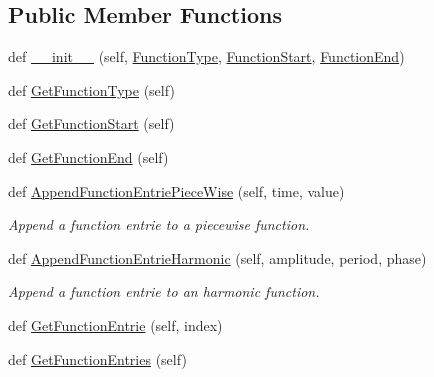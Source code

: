 \subsection*{Public Member Functions}
\begin{DoxyCompactItemize}
\item 
def \hyperlink{classgebtaero_1_1_time_function_1_1_time_function_a5f3a6ae6418be0f44d7a549af4a3f339}{\+\_\+\+\_\+init\+\_\+\+\_\+} (self, \hyperlink{classgebtaero_1_1_time_function_1_1_time_function_a71eb6968c49304736305aee5c1e37d51}{Function\+Type}, \hyperlink{classgebtaero_1_1_time_function_1_1_time_function_acd9020ddfc729ecc704fa0c246c2e903}{Function\+Start}, \hyperlink{classgebtaero_1_1_time_function_1_1_time_function_a21c1d719341196b82dd2def3400dd832}{Function\+End})
\item 
def \hyperlink{classgebtaero_1_1_time_function_1_1_time_function_a8dc2ddec757f586a51e250592b35c542}{Get\+Function\+Type} (self)
\item 
def \hyperlink{classgebtaero_1_1_time_function_1_1_time_function_a0ac4b6ccaaa06bb59697d195c213a23e}{Get\+Function\+Start} (self)
\item 
def \hyperlink{classgebtaero_1_1_time_function_1_1_time_function_afd4cbf5dab2375296785f178369bd16c}{Get\+Function\+End} (self)
\item 
def \hyperlink{classgebtaero_1_1_time_function_1_1_time_function_afa29c862ffe8297dbbea0aabaf8f5a08}{Append\+Function\+Entrie\+Piece\+Wise} (self, time, value)
\begin{DoxyCompactList}\small\item\em Append a function entrie to a piecewise function. \end{DoxyCompactList}\item 
def \hyperlink{classgebtaero_1_1_time_function_1_1_time_function_a8e4d81106458219357606a349486c2e6}{Append\+Function\+Entrie\+Harmonic} (self, amplitude, period, phase)
\begin{DoxyCompactList}\small\item\em Append a function entrie to an harmonic function. \end{DoxyCompactList}\item 
def \hyperlink{classgebtaero_1_1_time_function_1_1_time_function_ad72311bf84c87fe3af022735cdba6b6e}{Get\+Function\+Entrie} (self, index)
\item 
def \hyperlink{classgebtaero_1_1_time_function_1_1_time_function_aa37de4ed1aaf0c0f753582c3baee08fe}{Get\+Function\+Entries} (self)
\end{DoxyCompactItemize}
